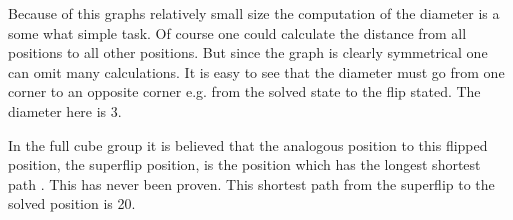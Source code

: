 Because of this graphs relatively small size the computation of the diameter is a some what simple task. Of course one could calculate the distance from all positions to all other positions. But since the graph is clearly symmetrical one can omit many calculations. It is easy to see that the diameter must go from one corner to an opposite corner e.g. from the solved state to the flip stated. The diameter here is 3. 

In the full cube group it is believed that the analogous position to this flipped position, the superflip position, is the position which has the longest shortest path \cite{speedsolving.wiki}. This has never been proven. This shortest path from the superflip to the solved position is 20.

